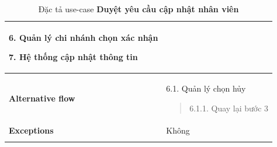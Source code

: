 {\begin{longtable}{| p{} | p{} |}
                    6. Quản lý chi nhánh chọn xác nhận
                    
                    7. Hệ thống cập nhật thông tin
                \\
                \hline
                    \textbf{Alternative flow}
                &
                6.1. Quản lý chọn hủy
                    \begin{quote} 
                    6.1.1. Quay lại bước 3
                    \end{quote}
                \\
                \hline
                    \textbf{Exceptions} 
                &
                    Không
                \\
                \hline
                \caption{Đặc tả use-case \textbf{Duyệt yêu cầu cập nhật nhân viên}}
            \end{longtable}
        }


